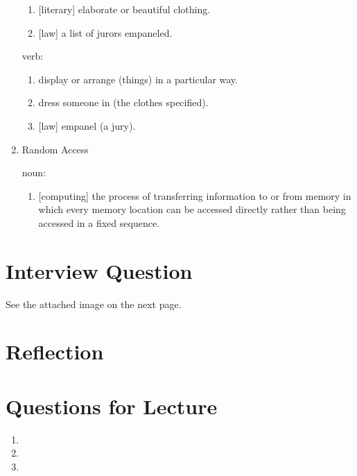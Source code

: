 \documentclass[12pt]{article}
\begin{document}
\begin{enumerate}
\begin{enumerate}
    \item {[literary]} elaborate or beautiful clothing.
    \item {[law]} a list of jurors empaneled.
  \end{enumerate}

  verb:

  \begin{enumerate}
    \item display or arrange (things) in a particular way.
    \item dress someone in (the clothes specified).
    \item {[law]} empanel (a jury).
  \end{enumerate}

  \item{Random Access}

  noun:

  \begin{enumerate}
    \item {[computing]} the process of transferring information to or from memory in which every memory location can be accessed directly rather than being accessed in a fixed sequence.
  \end{enumerate}
\end{enumerate}

\section{Interview Question}

See the attached image on the next page.

% 

\section{Reflection}

\section{Questions for Lecture}

\begin{enumerate}
  \item
  \item
  \item
\end{enumerate}
\end{document}
